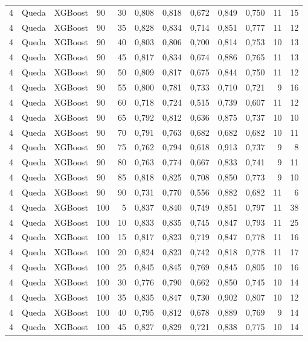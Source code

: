 \begin{longtable}{ccclrrrrrrrr}
4 & Queda & XGBoost & 90 & 30 & 0,808 & 0,818 & 0,672 & 0,849 & 0,750 & 11 & 15 \\
4 & Queda & XGBoost & 90 & 35 & 0,828 & 0,834 & 0,714 & 0,851 & 0,777 & 11 & 12 \\
4 & Queda & XGBoost & 90 & 40 & 0,803 & 0,806 & 0,700 & 0,814 & 0,753 & 10 & 13 \\
4 & Queda & XGBoost & 90 & 45 & 0,817 & 0,834 & 0,674 & 0,886 & 0,765 & 11 & 13 \\
4 & Queda & XGBoost & 90 & 50 & 0,809 & 0,817 & 0,675 & 0,844 & 0,750 & 11 & 12 \\
4 & Queda & XGBoost & 90 & 55 & 0,800 & 0,781 & 0,733 & 0,710 & 0,721 & 9 & 16 \\
4 & Queda & XGBoost & 90 & 60 & 0,718 & 0,724 & 0,515 & 0,739 & 0,607 & 11 & 12 \\
4 & Queda & XGBoost & 90 & 65 & 0,792 & 0,812 & 0,636 & 0,875 & 0,737 & 10 & 10 \\
4 & Queda & XGBoost & 90 & 70 & 0,791 & 0,763 & 0,682 & 0,682 & 0,682 & 10 & 11 \\
4 & Queda & XGBoost & 90 & 75 & 0,762 & 0,794 & 0,618 & 0,913 & 0,737 & 9 & 8 \\
4 & Queda & XGBoost & 90 & 80 & 0,763 & 0,774 & 0,667 & 0,833 & 0,741 & 9 & 11 \\
4 & Queda & XGBoost & 90 & 85 & 0,818 & 0,825 & 0,708 & 0,850 & 0,773 & 9 & 10 \\
4 & Queda & XGBoost & 90 & 90 & 0,731 & 0,770 & 0,556 & 0,882 & 0,682 & 11 & 6 \\
4 & Queda & XGBoost & 100 & 5 & 0,837 & 0,840 & 0,749 & 0,851 & 0,797 & 11 & 38 \\
4 & Queda & XGBoost & 100 & 10 & 0,833 & 0,835 & 0,745 & 0,847 & 0,793 & 11 & 25 \\
4 & Queda & XGBoost & 100 & 15 & 0,817 & 0,823 & 0,719 & 0,847 & 0,778 & 11 & 16 \\
4 & Queda & XGBoost & 100 & 20 & 0,824 & 0,823 & 0,742 & 0,818 & 0,778 & 11 & 17 \\
4 & Queda & XGBoost & 100 & 25 & 0,845 & 0,845 & 0,769 & 0,845 & 0,805 & 10 & 16 \\
4 & Queda & XGBoost & 100 & 30 & 0,776 & 0,790 & 0,662 & 0,850 & 0,745 & 10 & 14 \\
4 & Queda & XGBoost & 100 & 35 & 0,835 & 0,847 & 0,730 & 0,902 & 0,807 & 10 & 12 \\
4 & Queda & XGBoost & 100 & 40 & 0,795 & 0,812 & 0,678 & 0,889 & 0,769 & 9 & 14 \\
4 & Queda & XGBoost & 100 & 45 & 0,827 & 0,829 & 0,721 & 0,838 & 0,775 & 10 & 14 \\

\end{longtable}
